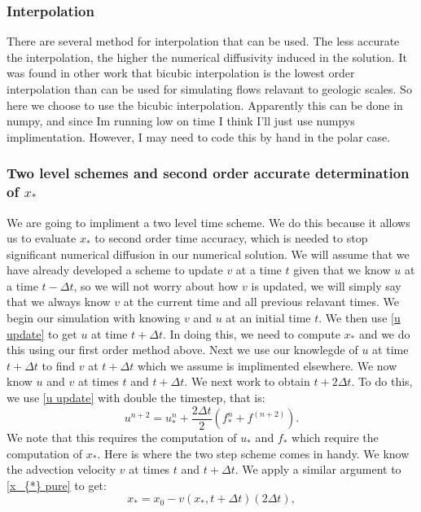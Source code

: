 \documentclass{article}
\begin{document}
\subsubsection*{Interpolation}
There are several method for interpolation that can be used. The less accurate the interpolation, the higher the numerical diffusivity induced in the solution. It was found in other work that bicubic interpolation is the lowest order interpolation than can be used for simulating flows relavant to geologic scales. So here we choose to use the bicubic interpolation. Apparently this can be done in numpy, and since Im running low on time I think I'll just use numpys implimentation. However, I may need to code this by hand in the polar case.


\subsubsection*{Two level schemes and second order accurate determination of $x_{*}$}
We are going to impliment a two level time scheme. We do this because it allows us to evaluate $x_{*}$ to second order time accuracy, which is needed to stop significant numerical diffusion in our numerical solution. We will assume that we have already developed a scheme to update $v$ at a time $t$ given that we know $u$ at a time $t-\Delta t$, so we will not worry about how $v$ is updated, we will simply say that we always know $v$ at the current time and all previous relavant times. We begin our simulation with knowing $v$ and $u$ at an initial time $t$. We then use \ref{u update} to get $u$ at time $t+\Delta t$. In doing this, we need to compute $x_{*}$ and we do this using our first order method above. Next we use our knowlegde of $u$ at time $t+\Delta t$ to find $v$ at $t+\Delta t$ which we assume is implimented elsewhere. We now know $u$ and $v$ at times $t$ and $t+\Delta t$. We next work to obtain $t+2 \Delta t$. To do this, we use \ref{u update} with double the timestep, that is:
\begin{equation}
	u^{n+2} = u^{n}_{*} +  \frac{2 \Delta t}{2} (f^{n}_{*} + f^{(n+2)} ).
\end{equation}
We note that this requires the computation of $u_{*}$ and $f_{*}$ which require the computation of $x_{*}$. Here is where the two step scheme comes in handy. We know the advection velocity $v$ at times $t$ and $t+\Delta t$. We apply a similar argument to \ref{x_{*} pure} to get:
\begin{equation}
	x_{*} = x_0 - v(x_{*}, t + \Delta t) (2 \Delta t),
\end{equation}
\end{document}
